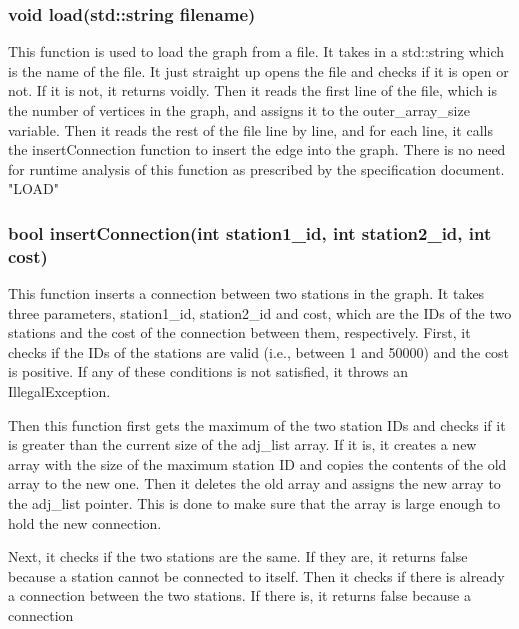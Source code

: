 		\subsubsection{{\color{orange} void } {\color{draculapurple}load}({\color{orange}std::string} filename)}
			This function is used to load the graph from a file. It takes in a {\color{orange}std::string} which is the name of the file.
			It just straight up opens the file and checks if it is open or not. If it is not, it returns voidly.
			Then it reads the first line of the file, which is the number of vertices in the graph, and assigns it to the {\color{draculapurple}outer\_array\_size} variable.
			Then it reads the rest of the file line by line, and for each line, it calls the {\color{draculapurple}insertConnection} function to insert the edge into the graph.
			There is no need for runtime analysis of this function as prescribed by the specification document.
			{\color{GoldenYellow}"LOAD"}
		
		\subsubsection{{\color{orange}bool} {\color{draculapurple}insertConnection}({\color{draculapurple}int} station1\_id, {\color{draculapurple}int} station2\_id, {\color{draculapurple}int} cost)}

			This function inserts a connection between two stations in the graph. It takes three parameters, 
			{\color{draculapurple}station1\_id}, {\color{draculapurple}station2\_id} and {\color{draculapurple}cost}, which are the IDs of the 
			two stations and the cost of the connection between them, respectively.
			First, it checks if the IDs of the stations are valid (i.e., between 1 and 50000) and the cost is positive.
			If any of these conditions is not satisfied, it throws an {\color{draculapurple}IllegalException}.

			Then this function first gets the maximum of the two station IDs and checks if it is greater than the current size of the 
			{\color{draculapurple}adj\_list} array. If it is, it creates a new array with the size of the maximum station ID and copies the
			contents of the old array to the new one. Then it deletes the old array and assigns the new array to the {\color{draculapurple}adj\_list}
			pointer. This is done to make sure that the array is large enough to hold the new connection.

			Next, it checks if the two stations are the same. If they are, it returns {\color{draculapurple}false} because a station cannot be connected to itself.
			Then it checks if there is already a connection between the two stations. If there is, it returns {\color{draculapurple}false} because a connection

